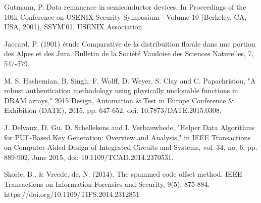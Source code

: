 \documentclass[journal, a4paper]{IEEEtran}
\begin{document}
\begin{thebibliography}{1}
    Gutmann, P. Data remanence in semiconductor devices. In Proceedings of the 10th Conference on USENIX Security Symposium - Volume 10 (Berkeley, CA, USA, 2001), SSYM’01, USENIX Association.

    Jaccard, P. (1901) étude Comparative de la distribuition florale dans une portion des Alpes et des Jura. Bulletin de la Société Vaudoise des Sciences Naturelles, 7, 547-579.

    M. S. Hashemian, B. Singh, F. Wolff, D. Weyer, S. Clay and C. Papachristou, "A robust authentication methodology using physically unclonable functions in DRAM arrays," 2015 Design, Automation \& Test in Europe Conference \& Exhibition (DATE), 2015, pp. 647-652, doi: 10.7873/DATE.2015.0308.

    J. Delvaux, D. Gu, D. Schellekens and I. Verbauwhede, "Helper Data Algorithms for PUF-Based Key Generation: Overview and Analysis," in IEEE Transactions on Computer-Aided Design of Integrated Circuits and Systems, vol. 34, no. 6, pp. 889-902, June 2015, doi: 10.1109/TCAD.2014.2370531.

    Skoric, B., & Vreede, de, N. (2014). The spammed code offset method. IEEE Transactions on Information Forensics and Security, 9(5), 875-884. https://doi.org/10.1109/TIFS.2014.2312851

\end{thebibliography}

\end{document}
